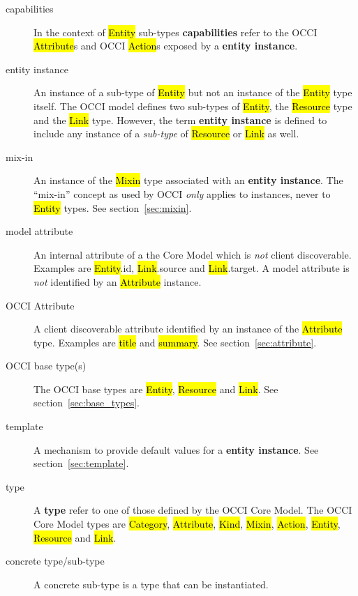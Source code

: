 \documentclass[10pt,a4paper]{article}
\begin{document}
\begin{description}
  \item[capabilities] In the context of \hl{Entity} sub-types
    {\bf  capabilities} refer to the OCCI \hl{Attribute}s and OCCI \hl{Action}s
    exposed by a {\bf entity instance}.

  \item[entity instance] An instance of a sub-type of
    \hl{Entity} but not an instance of the \hl{Entity} type itself.
    The OCCI model defines two sub-types of \hl{Entity},
    the \hl{Resource} type and the \hl{Link} type.  However, the term
    {\bf entity instance} is defined to include any instance of a
    {\em sub-type} of \hl{Resource} or \hl{Link} as well.

  \item[mix-in] An instance of the \hl{Mixin} type associated with an
    {\bf entity instance}. The ``mix-in'' concept as used by OCCI
    {\em only} applies to instances, never to \hl{Entity} types.
    See section~\ref{sec:mixin}.

  \item[model attribute] An internal attribute of a the Core Model which is
    {\em not} client discoverable. Examples are \hl{Entity}.id,
    \hl{Link}.source and \hl{Link}.target. A model attribute is {\em not}
    identified by an \hl{Attribute} instance.

  \item[OCCI Attribute] A client discoverable attribute identified by an
    instance of the \hl{Attribute} type. Examples are \hl{title}
    and \hl{summary}. See section~\ref{sec:attribute}.

  \item[OCCI base type(s)] The OCCI base types are \hl{Entity},
    \hl{Resource} and \hl{Link}.
    See section~\ref{sec:base_types}.

  \item[template] A mechanism to provide default values for a {\bf entity
    instance}. See section~\ref{sec:template}.

  \item[type] A {\bf type} refer to one of those defined by the OCCI
    Core Model.  The OCCI Core Model types are \hl{Category},
    \hl{Attribute},
    \hl{Kind}, \hl{Mixin}, \hl{Action}, \hl{Entity}, \hl{Resource} and
    \hl{Link}.

  \item[concrete type/sub-type] A concrete sub-type is a type that can
    be instantiated.
\end{description}
\end{document}
